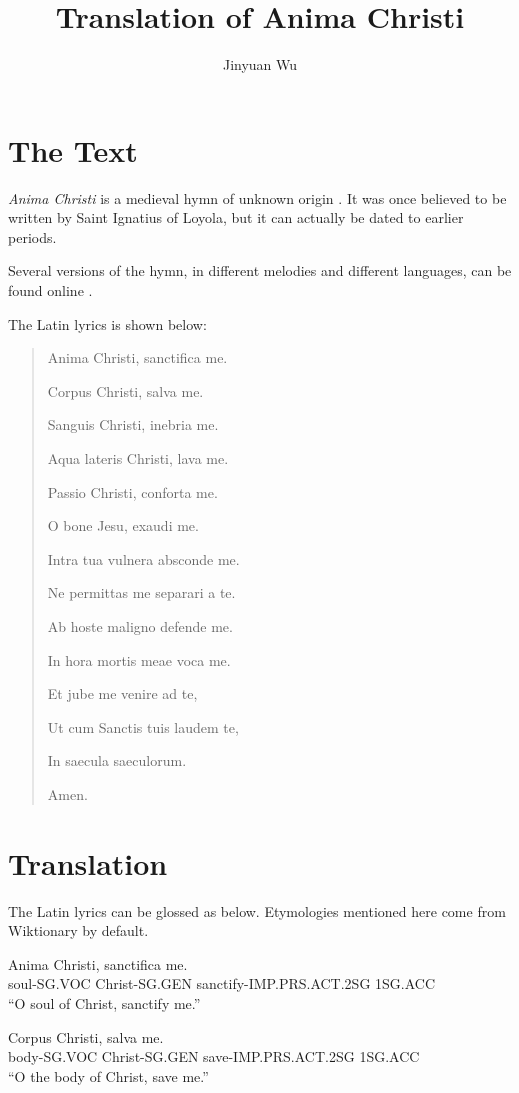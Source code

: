 \documentclass[a4paper]{article}
\title{Translation of Anima Christi}
\author{Jinyuan Wu}
\begin{document}
\maketitle

\section{The Text}

\emph{Anima Christi} is a medieval hymn of unknown origin \cite{wiki}. It was once believed to be written by Saint Ignatius of Loyola, but it can actually be dated to earlier periods.

Several versions of the hymn, in different melodies and different languages, can be found online \cite{youtube2,youtube3,youtube1}.

The Latin lyrics is shown below:
\begin{quotation}
    Anima Christi, sanctifica me. 

    Corpus Christi, salva me.
    
    Sanguis Christi, inebria me.
    
    Aqua lateris Christi, lava me.
    
    Passio Christi, conforta me.
    
    O bone Jesu, exaudi me.
    
    Intra tua vulnera absconde me.
    
    Ne permittas me separari a te.
    
    Ab hoste maligno defende me.
    
    In hora mortis meae voca me.
    
    Et jube me venire ad te,
    
    Ut cum Sanctis tuis laudem te,
    
    In saecula saeculorum.
    
    Amen.
\end{quotation}

\section{Translation}

The Latin lyrics can be glossed as below. Etymologies mentioned here come from Wiktionary by default.

\begin{exe}

\sn
\gll Anima        Christi,       sanctifica                me.  \\
     soul-SG.VOC  Christ-SG.GEN  sanctify-IMP.PRS.ACT.2SG  1SG.ACC \\
\glt  ``O soul of Christ, sanctify me.''

\sn
\gll Corpus      Christi,       salva                  me. \\
     body-SG.VOC Christ-SG.GEN  save-IMP.PRS.ACT.2SG   1SG.ACC \\
\glt ``O the body of Christ, save me.''
\end{exe}
\end{document}

